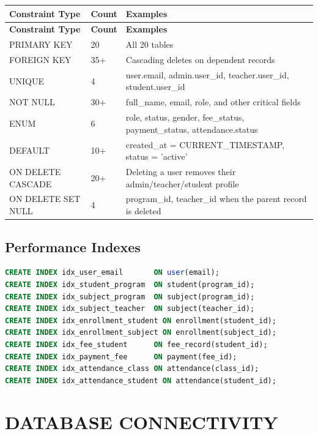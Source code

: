 \documentclass[12pt,a4paper]{report}
\begin{document}
\begin{longtable}{|L{4cm}|C{2cm}|L{7.5cm}|}
\hline
\textbf{Constraint Type} & \textbf{Count} & \textbf{Examples} \\
\hline
\endfirsthead
\hline
\textbf{Constraint Type} & \textbf{Count} & \textbf{Examples} \\
\hline
\endhead
PRIMARY KEY & 20 & All 20 tables \\
\hline
FOREIGN KEY & 35+ & Cascading deletes on dependent records \\
\hline
UNIQUE & 4 & user.email, admin.user\_id, teacher.user\_id, student.user\_id \\
\hline
NOT NULL & 30+ & full\_name, email, role, and other critical fields \\
\hline
ENUM & 6 & role, status, gender, fee\_status, payment\_status, attendance.status \\
\hline
DEFAULT & 10+ & created\_at = CURRENT\_TIMESTAMP, status = 'active' \\
\hline
ON DELETE CASCADE & 20+ & Deleting a user removes their admin/teacher/student profile \\
\hline
ON DELETE SET NULL & 4 & program\_id, teacher\_id when the parent record is deleted \\
\hline
\end{longtable}

\subsection{Performance Indexes}

\begin{lstlisting}[language=SQL, caption={Indexes for query optimization}]
CREATE INDEX idx_user_email       ON user(email);
CREATE INDEX idx_student_program  ON student(program_id);
CREATE INDEX idx_subject_program  ON subject(program_id);
CREATE INDEX idx_subject_teacher  ON subject(teacher_id);
CREATE INDEX idx_enrollment_student ON enrollment(student_id);
CREATE INDEX idx_enrollment_subject ON enrollment(subject_id);
CREATE INDEX idx_fee_student      ON fee_record(student_id);
CREATE INDEX idx_payment_fee      ON payment(fee_id);
CREATE INDEX idx_attendance_class ON attendance(class_id);
CREATE INDEX idx_attendance_student ON attendance(student_id);
\end{lstlisting}

\section{DATABASE CONNECTIVITY}
\end{document}
